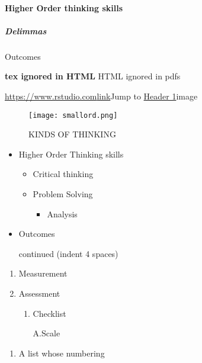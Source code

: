 \documentclass[
]{article}
\providecommand{\tightlist}{%
  \setlength{\itemsep}{0pt}\setlength{\parskip}{0pt}}
\begin{document}
\hypertarget{higher-order-thinking-skills}{%
\paragraph{Higher Order thinking
skills}\label{higher-order-thinking-skills}}

\hypertarget{delimmas}{%
\subparagraph{Delimmas}\label{delimmas}}

Outcomes

\textbf{tex ignored in HTML} HTML ignored in pdfs

\url{https://www.rstudio.com}\href{www.rstudio.com}{link}Jump to
\protect\hyperlink{anchor}{Header 1}image

\begin{figure}
\centering
\texttt{[image: smallord.png]}
\caption{KINDS OF THINKING}
\end{figure}

\begin{itemize}
\item
  Higher Order Thinking skills

  \begin{itemize}
  \item
    Critical thinking
  \item
    Problem Solving

    \begin{itemize}
    \tightlist
    \item
      Analysis
    \end{itemize}
  \end{itemize}
\item
  Outcomes

  continued (indent 4 spaces)
\end{itemize}

\begin{enumerate}
\def\labelenumi{\arabic{enumi}.}
\item
  Measurement
\item
  Assessment

  \begin{enumerate}
  \def\labelenumii{\roman{enumii})}
  \item
    Checklist

    A.Scale
  \end{enumerate}
\end{enumerate}

\begin{enumerate}
\def\labelenumi{(\arabic{enumi})}
\tightlist
\item
  A list whose numbering
\end{enumerate}
\end{document}
